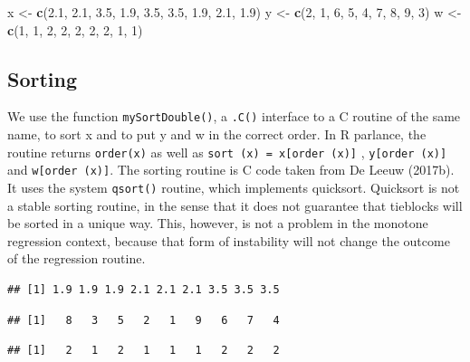 \documentclass[12pt,]{article}
\newenvironment{Shaded}{\begin{snugshade}}{\end{snugshade}}
\newcommand{\KeywordTok}[1]{\textcolor[rgb]{0.13,0.29,0.53}{\textbf{{#1}}}}
\newcommand{\DecValTok}[1]{\textcolor[rgb]{0.00,0.00,0.81}{{#1}}}
\newcommand{\FloatTok}[1]{\textcolor[rgb]{0.00,0.00,0.81}{{#1}}}
\newcommand{\StringTok}[1]{\textcolor[rgb]{0.31,0.60,0.02}{{#1}}}
\newcommand{\NormalTok}[1]{{#1}}
\begin{document}
\begin{Shaded}
\begin{Highlighting}[]
\NormalTok{x <-}\StringTok{ }\KeywordTok{c}\NormalTok{(}\FloatTok{2.1}\NormalTok{, }\FloatTok{2.1}\NormalTok{, }\FloatTok{3.5}\NormalTok{, }\FloatTok{1.9}\NormalTok{, }\FloatTok{3.5}\NormalTok{, }\FloatTok{3.5}\NormalTok{, }\FloatTok{1.9}\NormalTok{, }\FloatTok{2.1}\NormalTok{, }\FloatTok{1.9}\NormalTok{)}
\NormalTok{y <-}\StringTok{ }\KeywordTok{c}\NormalTok{(}\DecValTok{2}\NormalTok{, }\DecValTok{1}\NormalTok{, }\DecValTok{6}\NormalTok{, }\DecValTok{5}\NormalTok{, }\DecValTok{4}\NormalTok{, }\DecValTok{7}\NormalTok{, }\DecValTok{8}\NormalTok{, }\DecValTok{9}\NormalTok{, }\DecValTok{3}\NormalTok{)}
\NormalTok{w <-}\StringTok{ }\KeywordTok{c}\NormalTok{(}\DecValTok{1}\NormalTok{, }\DecValTok{1}\NormalTok{, }\DecValTok{2}\NormalTok{, }\DecValTok{2}\NormalTok{, }\DecValTok{2}\NormalTok{, }\DecValTok{2}\NormalTok{, }\DecValTok{2}\NormalTok{, }\DecValTok{1}\NormalTok{, }\DecValTok{1}\NormalTok{)}
\end{Highlighting}
\end{Shaded}

\subsection{Sorting}\label{sorting}

We use the function \texttt{mySortDouble()}, a \texttt{.C()} interface
to a C routine of the same name, to sort x and to put y and w in the
correct order. In R parlance, the routine returns \texttt{order(x)} as
well as \texttt{sort\ (x)\ =\ x{[}order\ (x){]}} ,
\texttt{y{[}order\ (x){]}} and \texttt{w{[}order\ (x){]}}. The sorting
routine is C code taken from De Leeuw (2017b). It uses the system
\texttt{qsort()} routine, which implements quicksort. Quicksort is not a
stable sorting routine, in the sense that it does not guarantee that
tieblocks will be sorted in a unique way. This, however, is not a
problem in the monotone regression context, because that form of
instability will not change the outcome of the regression routine.

\begin{verbatim}
## [1] 1.9 1.9 1.9 2.1 2.1 2.1 3.5 3.5 3.5
\end{verbatim}

\begin{verbatim}
## [1]   8   3   5   2   1   9   6   7   4
\end{verbatim}

\begin{verbatim}
## [1]   2   1   2   1   1   1   2   2   2
\end{verbatim}
\end{document}
